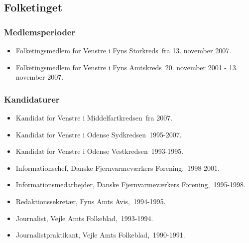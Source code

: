 \documentclass[11pt, a4paper]{awesome-cv}
\begin{document}
\begin{cvletter}
\subsection*{Folketinget}
\subsubsection*{Medlemsperioder}
\begin{itemize}
\item Folketingsmedlem for Venstre i Fyns Storkreds fra 13. november 2007.
\item Folketingsmedlem for Venstre i Fyns Amtskreds 20. november 2001 - 13. november 2007.
\end{itemize}
\subsubsection*{Kandidaturer}
\begin{itemize}
\item Kandidat for Venstre i Middelfartkredsen fra 2007.
\item Kandidat for Venstre i Odense Sydkredsen 1995-2007.
\item Kandidat for Venstre i Odense Vestkredsen 1993-1995.
\end{itemize}
\begin{itemize}
\item Informationschef, Danske Fjernvarmeværkers Forening, 1998-2001.
\item Informationsmedarbejder, Danske Fjernvarmeværkers Forening, 1995-1998.
\item Redaktionssekretær, Fyns Amts Avis, 1994-1995.
\item Journalist, Vejle Amts Folkeblad, 1993-1994.
\item Journalistpraktikant, Vejle Amts Folkeblad, 1990-1991.
\end{itemize}
\end{cvletter}
\end{document}

